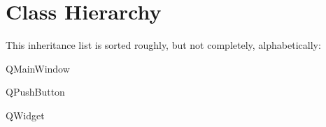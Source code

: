 \section{Class Hierarchy}
This inheritance list is sorted roughly, but not completely, alphabetically\+:\begin{DoxyCompactList}
\item Q\+Main\+Window\begin{DoxyCompactList}
\item {}
\item {}
\end{DoxyCompactList}
\item Q\+Push\+Button\begin{DoxyCompactList}
\item {}
\end{DoxyCompactList}
\item Q\+Widget\begin{DoxyCompactList}
\item {}
\item {}
\end{DoxyCompactList}
\item {}
\begin{DoxyCompactList}
\item {}
\end{DoxyCompactList}
\end{DoxyCompactList}
